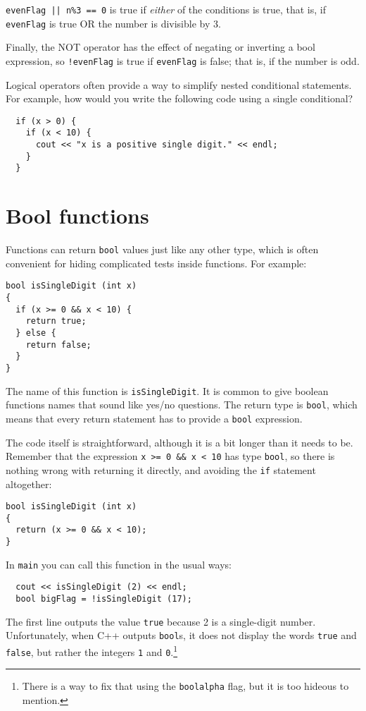 
{\tt evenFlag || n\%3 == 0} is true if {\em either} of
the conditions is true, that is, if {\tt evenFlag} is true OR the
number is divisible by 3.

Finally, the NOT operator has the effect of negating or
inverting a bool expression, so {\tt !evenFlag} is true
if {\tt evenFlag} is false; that is, if the number is odd.


Logical operators often provide a way to simplify nested
conditional statements.  For example, how would you write
the following code using a single conditional?

\begin{verbatim}
  if (x > 0) {
    if (x < 10) {
      cout << "x is a positive single digit." << endl;
    }
  }
\end{verbatim}

\section{Bool functions}
\label{bool}

Functions can return {\tt bool} values just like any other type,
which is often convenient for hiding complicated tests inside
functions.  For example:

\begin{verbatim}
bool isSingleDigit (int x)
{
  if (x >= 0 && x < 10) {
    return true;
  } else {
    return false;
  }
}
\end{verbatim}
%
The name of this function is {\tt isSingleDigit}.  It is common
to give boolean functions names that sound like yes/no questions.
The return type is {\tt bool}, which means that every return
statement has to provide a {\tt bool} expression.

The code itself is straightforward, although it is a bit longer than
it needs to be.  Remember that the expression {\tt x >= 0 \&\& x < 10}
has type {\tt bool}, so there is nothing wrong with returning it
directly, and avoiding the {\tt if} statement altogether:

\begin{verbatim}
bool isSingleDigit (int x)
{
  return (x >= 0 && x < 10);
}
\end{verbatim}
%
In {\tt main} you can call this function in the usual ways:

\begin{verbatim}
  cout << isSingleDigit (2) << endl;
  bool bigFlag = !isSingleDigit (17);
\end{verbatim}
%
The first line outputs the value {\tt true} because 2 is a
single-digit number.  Unfortunately, when C++ outputs {\tt bool}s, it
does not display the words {\tt true} and {\tt false}, but rather the
integers {\tt 1} and {\tt 0}.\footnote{There is a way to fix that
using the {\tt boolalpha} flag, but it is too hideous to mention.}

